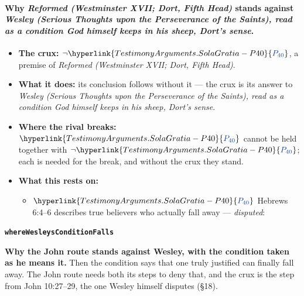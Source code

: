 \documentclass[11pt]{article}
\newcommand{\pvar}[2]{\hyperlink{#1-P#2}{\textcolor{claimlink}{P_{#2}}}}
\begin{document}
\paragraph{Why \emph{Reformed (Westminster XVII; Dort, Fifth Head)} stands against \emph{Wesley (Serious Thoughts upon the Perseverance of the Saints), read as a condition God himself keeps in his sheep, Dort’s sense}.}
\begin{itemize}
\item \textbf{The crux:} \(\lnot \pvar{TestimonyArguments.SolaGratia}{40}\), a premise of \emph{Reformed (Westminster XVII; Dort, Fifth Head)}.
\item \textbf{What it does:} its conclusion follows without it --- the crux is its answer to \emph{Wesley (Serious Thoughts upon the Perseverance of the Saints), read as a condition God himself keeps in his sheep, Dort’s sense}.
\item \textbf{Where the rival breaks:} \(\pvar{TestimonyArguments.SolaGratia}{40}\) cannot be held together with \(\lnot \pvar{TestimonyArguments.SolaGratia}{40}\); each is needed for the break, and without the crux they stand.
\item \textbf{What this rests on:}
\begin{itemize}
\item \(\pvar{TestimonyArguments.SolaGratia}{40}\) Hebrews 6:4–6 describes true believers who actually fall away --- \emph{disputed}: \cite[137--138]{calvin-hebrews-1853}
\end{itemize}
\end{itemize}
\par\medskip\noindent\textbf{\texttt{where\allowbreak{}Wesleys\allowbreak{}Condition\allowbreak{}Falls}}\par\nobreak\noindent
\textbf{Why the John route stands against Wesley, with the condition taken as he means it.} Then the condition says that one truly justified can finally fall away. The John route needs both its steps to deny that, and the crux is the step from John 10:27–29, the one Wesley himself disputes (§18).
\end{document}
